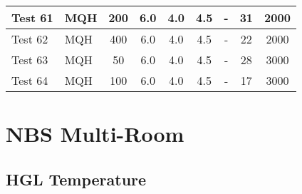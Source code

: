 \begin{table}[!ht]
\begin{center}
\begin{tabular}{|l|l|c|c|c|c|c|c|c|}
Test 61    &  MQH               &  200            &  6.0       &  4.0       &  4.5       &  -              &  31                    &  2000              \\ \hline
Test 62    &  MQH               &  400            &  6.0       &  4.0       &  4.5       &  -              &  22                    &  2000              \\ \hline
Test 63    &  MQH               &  50             &  6.0       &  4.0       &  4.5       &  -              &  28                    &  3000              \\ \hline
Test 64    &  MQH               &  100            &  6.0       &  4.0       &  4.5       &  -              &  17                    &  3000              \\ \hline
\end{tabular}
\end{center}
\end{table}


\clearpage


\section{NBS Multi-Room}

\subsection*{HGL Temperature}

